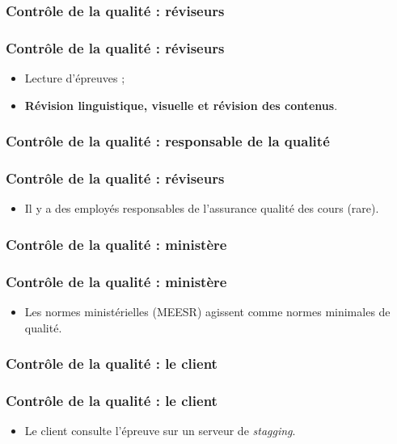 					\subsubsection{Contrôle de la qualité : réviseurs} 
							\begin{frame}[allowframebreaks]
							\frametitle{Contrôle de la qualité : réviseurs}
                        			
							\begin{itemize}
							\item Lecture d’épreuves ;
							\item \textbf{Révision linguistique,  visuelle et révision des contenus}.
							
							\end{itemize}						
					\end{frame}	
					\subsubsection{Contrôle de la qualité : responsable de la qualité} 
							\begin{frame}[allowframebreaks]
							\frametitle{Contrôle de la qualité : réviseurs}
                        			
							\begin{itemize}
							\item Il y a des employés responsables de l’assurance qualité des cours (rare).
							\end{itemize}						
					\end{frame}	
					\subsubsection{Contrôle de la qualité : ministère} 
							\begin{frame}[allowframebreaks]
							\frametitle{Contrôle de la qualité : ministère}
                        			
							\begin{itemize}
							\item Les normes ministérielles (MEESR) agissent comme normes minimales de qualité.
							\end{itemize}						
					\end{frame}	
					\subsubsection{Contrôle de la qualité : le client} 
							\begin{frame}[allowframebreaks]
							\frametitle{Contrôle de la qualité : le client}
                        			
							\begin{itemize}
							\item Le client consulte l’épreuve sur un serveur de \textit{stagging}.
							\end{itemize}						
					\end{frame}	
					
